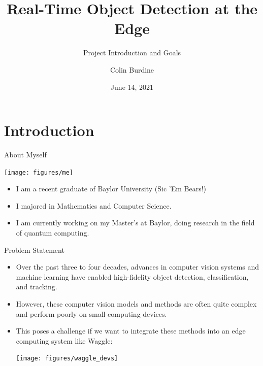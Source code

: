 \documentclass[10pt]{beamer}
\title{Real-Time Object Detection at the Edge}
\subtitle{Project Introduction and Goals}
\date{June 14, 2021}
\author{Colin Burdine}
\institute{SULI Intern, Hosted at Argonne National Laboratory}
\begin{document}
\maketitle


\section{Introduction}

\begin{frame}{About Myself}
\begin{center}
\texttt{[image: figures/me]}
\end{center}
\begin{itemize}
\item I am a recent graduate of Baylor University (Sic 'Em Bears!)
\item I majored in Mathematics and Computer Science.
\item I am currently working on my Master's at Baylor, doing research in the field of quantum computing.
\end{itemize}
\end{frame}

\begin{frame}{Problem Statement}

\begin{itemize}
\item Over the past three to four decades, advances in computer vision systems and machine learning have enabled high-fidelity object detection, classification, and tracking.

\item However, these computer vision models and methods are often quite complex and perform poorly on small computing devices.

\pause 
\item This poses a challenge if we want to integrate these methods into an \alert{edge computing} system like Waggle:\\[4mm]
\begin{center}
\texttt{[image: figures/waggle\_devs]}
\end{center}

\end{itemize}
\end{frame}
\end{document}
